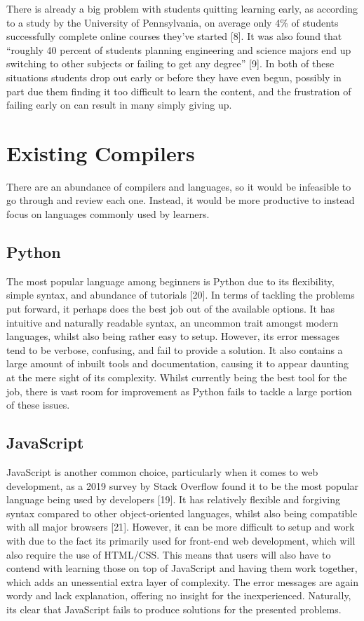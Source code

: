 \documentclass[
]{report}
\begin{document}
There is already a big problem with students quitting learning early, as
according to a study by the University of Pennsylvania, on average only
4\% of students successfully complete online courses they've started
{[}8{]}. It was also found that ``roughly 40 percent of students
planning engineering and science majors end up switching to other
subjects or failing to get any degree'' {[}9{]}. In both of these
situations students drop out early or before they have even begun,
possibly in part due them finding it too difficult to learn the
content, and the frustration of failing early on can result in many
simply giving up.

\section{Existing Compilers}
There are an abundance of compilers and languages, so it would be
infeasible to go through and review each one. Instead, it would be more
productive to instead focus on languages commonly used by learners.

\subsection{Python}
The most popular language among beginners is Python due to its
flexibility, simple syntax, and abundance of tutorials {[}20{]}. In
terms of tackling the problems put forward, it perhaps does the best job
out of the available options. It has intuitive and naturally readable
syntax, an uncommon trait amongst modern languages, whilst also being
rather easy to setup. However, its error messages tend to be verbose,
confusing, and fail to provide a solution. It also contains a large
amount of inbuilt tools and documentation, causing it to appear daunting
at the mere sight of its complexity. Whilst currently being the best
tool for the job, there is vast room for improvement as Python fails to
tackle a large portion of these issues.

\subsection{JavaScript}
JavaScript is another common choice, particularly when it comes to web
development, as a 2019 survey by Stack Overflow found it to be the most
popular language being used by developers {[}19{]}. It has relatively
flexible and forgiving syntax compared to other object-oriented
languages, whilst also being compatible with all major browsers
{[}21{]}. However, it can be more difficult to setup and work with due
to the fact its primarily used for front-end web development, which will
also require the use of HTML/CSS. This means that users will also have
to contend with learning those on top of JavaScript and having them work
together, which adds an unessential extra layer of complexity. The error
messages are again wordy and lack explanation, offering no insight for
the inexperienced. Naturally, its clear that JavaScript fails to produce
solutions for the presented problems.
\end{document}
